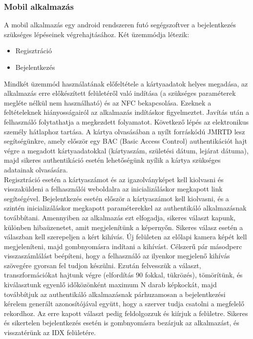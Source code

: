 \subsubsection{Mobil alkalmazás}
A mobil alkalmazás egy android rendszeren futó segégszoftver a bejelentkezés szükséges lépéseinek végrehajtásához. Két üzemmódja létezik:
\begin{itemize}
\item Regisztráció
\item Bejelentkezés
\end{itemize}

Mindkét üzemmód használatának előfeltétele a kártyaadatok helyes megadása, az alkalmazás erre előkészített felületéről való indítása (a szükséges paraméterek megléte nélkül nem használható) és az NFC bekapcsolása. Ezeknek a feltételeknek hiányosságairól az alkalmazás indításkor figyelmeztet. Javítás után a felhasználó folytathatja a megkezdett folyamatot. Következő lépés az elektronikus személy hátlaphoz tartása. A kártya olvasásában a nyílt forráskódú JMRTD lesz segítségünkre, amely először egy BAC (Basic Access Control) authentikációt hajt végre a megadott kártyaadatokkal (kártyaszám, születési dátum, lejárat dátuma), majd sikeres authentikáció esetén lehetőségünk nyílik a kártya szükséges adatainak olvasására.
\\Regisztráció esetén a kártyaszámot és az igazolványképet kell kiolvasni és visszaküldeni a felhasználói weboldalra az inicializáláskor megkapott link segítségével.
Bejelentkezés esetén először a kártyaszámot kell kiolvasni, és a szintén inicializáláskor megkapott paraméterekkel az authentikáló alkalmazásnak továbbítani. Amennyiben az alkalmazás ezt elfogadja, sikeres választ kapunk, különben hibaüzenetet, amit megjelenítünk a képernyőn. Sikeres válasz esetén a válaszban kell szerepeljen a kért kihívás. Új felületen az előlapi kamera képét kell megjeleníteni, majd gombnyomásra indítani a kihívást. Célszerű pár másodperc visszaszámlálást beépíteni, hogy a felhasználó az ilyenkor megjelenő kihívás szövegére gyorsan fel tudjon készülni. Ezután felvesszük a választ, transzformációkat hajtunk végre (elfordítás 90 fokkal, tükrözés), tömörítünk, és kiválasztunk egyenlő időközönként maximum N darab képkockát, majd továbbítjuk az authentikáló alkalmazásnak párhuzamosan a bejelentkezési kérelem generált azonosítójával együtt, hogy a szerver tudja csatolni a megfelelő rekordhoz. Az erre kapott választ pedig feldolgozzuk és kiírjuk a felületre. Sikeres és sikertelen bejelentkezés esetén is gombnyomásra bezárjuk az alkalmazást, és visszatérünk az IDX felületére.

